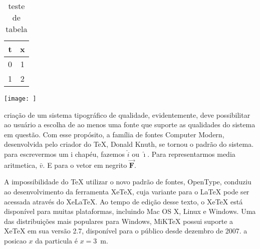 \documentclass[twocolumn,10pt]{article}
\begin{document}
%
\begin{table}[t] %
\caption{teste de tabela} %
\label{tab:teste_2} %
\begin{tabular}{c|c}
 t & x \\ \hline
 0 & 1 \\
 1 & 2 \\
\end{tabular}
\texttt{[image: ]} %
\end{table}
%
criação de um sistema tipográfico de qualidade, evidentemente, deve possibilitar ao usuário a escolha de ao menos uma fonte que suporte as qualidades do sistema em questão. Com esse propósito, a família de fontes Computer Modern, desenvolvida pelo criador do TeX, Donald Knuth, se tornou o padrão do sistema. para escrevermos um i chapéu, fazemos $\hat{i}$ ou $\hat{\imath}$.
Para representarmos media aritmetica, $\bar{v}$. E para o vetor em negrito $\vec{\bm{F}}$.

A impossibilidade do TeX utilizar o novo padrão de fontes, OpenType, conduziu ao desenvolvimento da ferramenta XeTeX, cuja variante para o LaTeX pode ser acessada através do XeLaTeX. Ao tempo de edição desse texto, o XeTeX está disponível para muitas plataformas, incluindo Mac OS X, Linux e Windows. Uma das distribuições mais populares para Windows, MiKTeX possui suporte a XeTeX em sua versão 2.7, disponível para o público desde dezembro de 2007. a posicao $x$ da particula é $x=3$~m.
\end{document}
